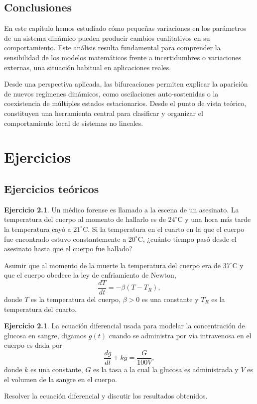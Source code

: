 \documentclass[12pt, a4paper]{amsbook}
\theoremstyle{remark}
\theoremstyle{definition}
\newtheorem{ejer}[teo]{Ejercicio}
\numberwithin{section}{chapter}
\numberwithin{subsection}{section}
\numberwithin{equation}{section}
\numberwithin{figure}{chapter}
\begin{document}
\section{Conclusiones}

En este capítulo hemos estudiado cómo pequeñas variaciones en los parámetros de un sistema dinámico pueden producir cambios cualitativos en su comportamiento. Este análisis resulta fundamental para comprender la sensibilidad de los modelos matemáticos frente a incertidumbres o variaciones externas, una situación habitual en aplicaciones reales.

Desde una perspectiva aplicada, las bifurcaciones permiten explicar la aparición de nuevos regímenes dinámicos, como oscilaciones auto-sostenidas o la coexistencia de múltiples estados estacionarios. Desde el punto de vista teórico, constituyen una herramienta central para clasificar y organizar el comportamiento local de sistemas no lineales.


\chapter{Ejercicios}

\section{Ejercicios teóricos}
\begin{ejer}
Un médico forense es llamado a la escena de un asesinato. La temperatura del cuerpo al momento de hallarlo es de $24^\circ$C y una hora más tarde la temperatura cayó a $21^\circ$C. Si la temperatura en el cuarto en la que el cuerpo fue encontrado estuvo constantemente a $20^\circ$C, ¿cuánto tiempo pasó desde el asesinato hasta que el cuerpo fue hallado?

Asumir que al momento de la muerte la temperatura del cuerpo era de $37^\circ$C y que el cuerpo obedece la ley de enfriamiento de Newton,
$$
\frac{dT}{dt} = -\beta (T-T_R),
$$
donde $T$ es la temperatura del cuerpo, $\beta>0$ es una constante y $T_R$ es la temperatura del cuarto.
\end{ejer}

\begin{ejer}
La ecuación diferencial usada para modelar la concentración de glucosa en sangre, digamos $g(t)$ cuando se administra por vía intravenosa en el cuerpo es dada por
$$
\frac{dg}{dt} + kg = \frac{G}{100V},
$$
donde $k$ es una constante, $G$ es la tasa a la cual la glucosa es administrada y $V$ es el volumen de la sangre en el cuerpo. 

Resolver la ecuación diferencial y discutir los resultados obtenidos.
\end{ejer}
\end{document}
